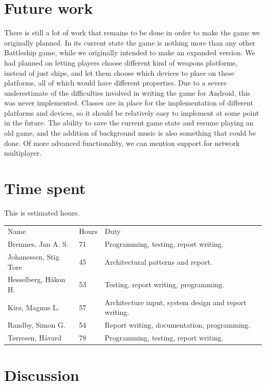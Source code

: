 \documentclass[12pt, a4paper]{article}
\begin{document}
\section{Future work}
	There is still a lot of work that remains to be done in order to make the game we originally planned. In its current state the game is nothing more than any other Battleship game, while we originally intended to make an expanded version. We had planned on letting players choose different kind of weapons platforms, instead of just ships, and let them choose which devices to place on these platforms, all of which would have different properties. Due to a severe underestimate of the difficulties involved in writing the game for Android, this was never implemented. Classes are in place for the implementation of different platforms and devices, so it should be relatively easy to implement at some point in the future. The ability to save the current game state and resume playing an old game, and the addition of background music is also something that could be done. Of more advanced functionality, we can mention support for network multiplayer.


\section{Time spent}
This is estimated hours. 
\begin{tabular}{  p{} p{} p{} }
    Name & Hours &  Duty \\
    Bremnes, Jan A. S. & 71 & Programming, testing, report writing.\\
    Johanessen, Stig Tore & 45 & Architectural patterns and report.\\
    Hesselberg, Håkon H. & 53 & Testing, report writing, programming.\\
    Kirø, Magnus L. & 57 & Architecture input, system design and report writing.\\
    Randby, Simon G. & 54 & Report writing, documentation, programming.\\
    Tørresen, Håvard & 78 & Programming, testing, report writing.\\
\end{tabular}

\section{Discussion}
\end{document}
